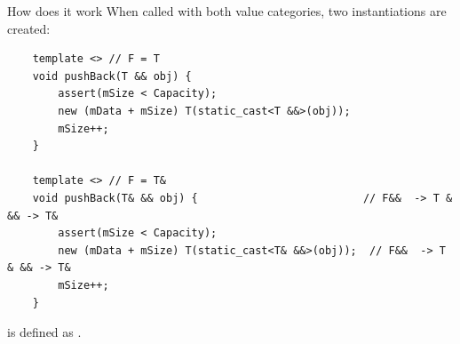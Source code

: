 \begin{frame}[fragile]{How does it work}
  When called with both value categories, two instantiations are created:
  \begin{verbatim}
    template <> // F = T
    void pushBack(T && obj) {
        assert(mSize < Capacity);
        new (mData + mSize) T(static_cast<T &&>(obj));
        mSize++;
    }

    template <> // F = T&
    void pushBack(T& && obj) {                          // F&&  -> T & && -> T&
        assert(mSize < Capacity);
        new (mData + mSize) T(static_cast<T& &&>(obj));  // F&&  -> T & && -> T&
        mSize++;
    }
  \end{verbatim}

  \begin{sqt:definition}
     is defined as .
  \end{sqt:definition}
\end{frame}

